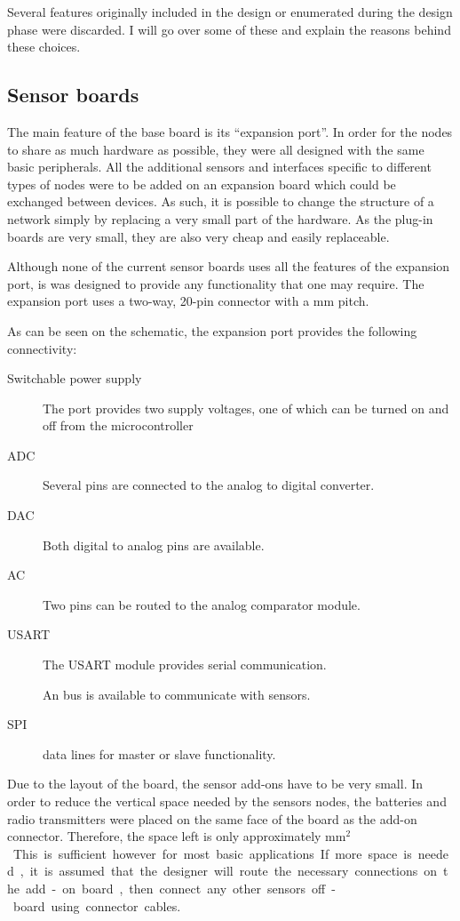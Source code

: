 Several features originally included in the design or enumerated during the
design phase were discarded. I will go over some of these and explain the
reasons behind these choices.


\subsection{Sensor boards}

The main feature of the base board is its ``expansion port''. In order for the
nodes to share as much hardware as possible, they were all designed with the
same basic peripherals. All the additional sensors and interfaces specific to
different types of nodes were to be added on an expansion board which could be
exchanged between devices. As such, it is possible to change the structure of a
network simply by replacing a very small part of the hardware. As the plug-in
boards are very small, they are also very cheap and easily replaceable.

Although none of the current sensor boards uses all the features of the
expansion port, is was designed to provide any functionality that one may
require. The expansion port uses a two-way, 20-pin connector with a \unit[2]{mm}
pitch.

As can be seen on the schematic, the expansion port provides the following
connectivity:
\begin{description}
  \item [Switchable power supply] The port provides two supply voltages, one of
    which can be turned on and off from the microcontroller
  \item[ADC] Several pins are connected to the analog to digital converter.
  \item[DAC] Both digital to analog pins are available.
  \item[AC] Two pins can be routed to the analog comparator module.
  \item[USART] The USART module provides serial communication.
  \item[\IIC{}] An \IIC{} bus is available to communicate with sensors.
  \item[SPI] data lines for master or slave functionality.
\end{description}

Due to the layout of the board, the sensor add-ons have to be very small. In
order to reduce the vertical space needed by the sensors nodes, the batteries
and radio transmitters were placed on the same face of the board as the add-on
connector. Therefore, the space left is only approximately \unit[25x25]{mm$^2$}.
This is sufficient however for most basic applications. If more space is needed,
it is assumed that the designer will route the necessary connections on the
add-on board, then connect any other sensors off-board using connector cables.


